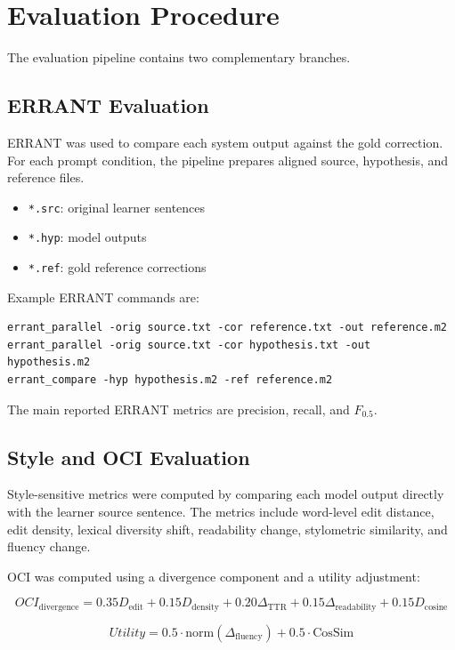 \section{Evaluation Procedure}

The evaluation pipeline contains two complementary branches.

\subsection{ERRANT Evaluation}

ERRANT was used to compare each system output against the gold correction. For each prompt condition, the pipeline prepares aligned source, hypothesis, and reference files.

\begin{itemize}
    \item \texttt{*.src}: original learner sentences
    \item \texttt{*.hyp}: model outputs
    \item \texttt{*.ref}: gold reference corrections
\end{itemize}

Example ERRANT commands are:

\begin{verbatim}
errant_parallel -orig source.txt -cor reference.txt -out reference.m2
errant_parallel -orig source.txt -cor hypothesis.txt -out hypothesis.m2
errant_compare -hyp hypothesis.m2 -ref reference.m2
\end{verbatim}

The main reported ERRANT metrics are precision, recall, and $F_{0.5}$.

\subsection{Style and OCI Evaluation}

Style-sensitive metrics were computed by comparing each model output directly with the learner source sentence. The metrics include word-level edit distance, edit density, lexical diversity shift, readability change, stylometric similarity, and fluency change.

OCI was computed using a divergence component and a utility adjustment:

\[
OCI_{\text{divergence}} =
0.35D_{\text{edit}} +
0.15D_{\text{density}} +
0.20\Delta_{\text{TTR}} +
0.15\Delta_{\text{readability}} +
0.15D_{\text{cosine}}
\]

\[
Utility =
0.5 \cdot \text{norm}(\Delta_{\text{fluency}})
+ 0.5 \cdot \text{CosSim}
\]

